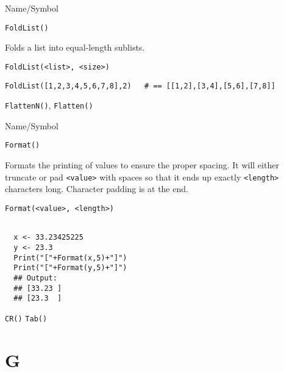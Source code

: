 \rl


\begin{desc}{Name/Symbol}
\item[Name/Symbol]	\verb+FoldList()+

\item[Description]	Folds a list into equal-length sublists.

\item[Usage]
\begin{verbatim}
FoldList(<list>, <size>)
\end{verbatim}

\item[Example]
\begin{verbatim}
FoldList([1,2,3,4,5,6,7,8],2)	# == [[1,2],[3,4],[5,6],[7,8]]
\end{verbatim}
 
\item[See Also]	\verb+FlattenN()+, \verb+Flatten()+
\end{desc}

\rl



\begin{desc}{Name/Symbol}
\item[Name/Symbol]	\verb+Format()+            

\item[Description]	Formats the printing of values to ensure the
  proper spacing. It will either truncate or pad \verb+<value>+ with spaces
  so that it ends up exactly \verb+<length>+ characters long.  Character
  padding is at the end.
 
\item[Usage]
\begin{verbatim}
Format(<value>, <length>)
\end{verbatim}

\item[Example]	
\begin{verbatim}

  x <- 33.23425225
  y <- 23.3
  Print("["+Format(x,5)+"]")
  Print("["+Format(y,5)+"]")
  ## Output: 
  ## [33.23 ]
  ## [23.3  ]
\end{verbatim}
         

\item[See Also]	
\verb+CR()+ \verb+Tab()+
\end{desc}

\rl
\section{G}
\rl


